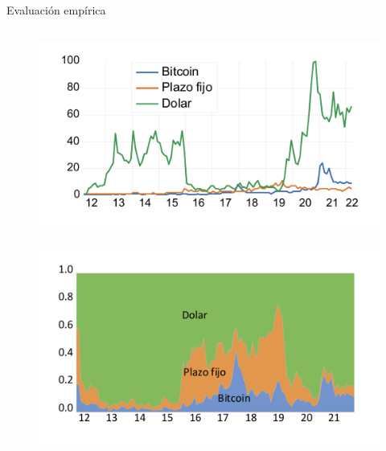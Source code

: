 \begin{frame}[t]
\begin{block}{Evaluación empírica}
\begin{minipage}[t][.4\textheight][t]{\textwidth}
        
        \begin{column}{0.5\textwidth}
    \tiny
    \begin{figure}[H]
        \begin{center}
             \includegraphics[width=1\textwidth]{images/C4/times_series_gtrend_tot.pdf} %
         \end{center}
    \end{figure}
    \end{column}
    \begin{column}{0.5\textwidth}  
    \tiny
    \begin{figure}[H]
        \begin{center}
         \includegraphics[width=1\textwidth]{images/C4/spike_gtrend_tot.pdf} %
        \end{center}
        
        \end{figure}
\end{column}

    \end{minipage}
\end{block}


\end{frame}

